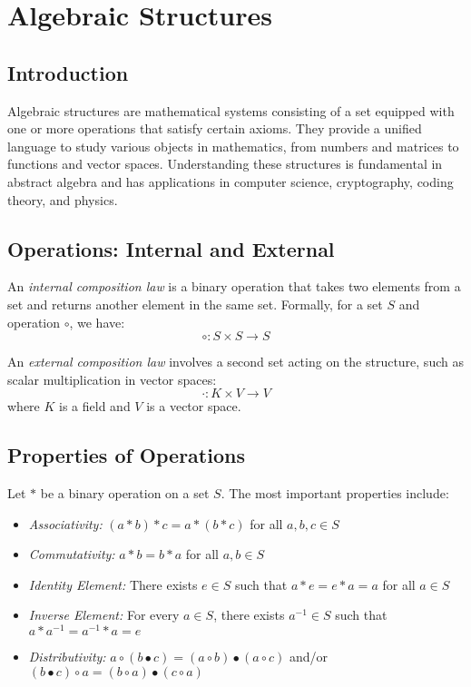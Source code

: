 \section{Algebraic Structures}

\subsection{Introduction}

Algebraic structures are mathematical systems consisting of a set equipped with one or more operations that satisfy certain axioms. They provide a unified language to study various objects in mathematics, from numbers and matrices to functions and vector spaces. Understanding these structures is fundamental in abstract algebra and has applications in computer science, cryptography, coding theory, and physics.

\subsection{Operations: Internal and External}

An \emph{internal composition law} is a binary operation that takes two elements from a set and returns another element in the same set. Formally, for a set \(S\) and operation \(\circ\), we have:
\[
\circ: S \times S \rightarrow S
\]

An \emph{external composition law} involves a second set acting on the structure, such as scalar multiplication in vector spaces:
\[
\cdot: K \times V \rightarrow V
\]
where \(K\) is a field and \(V\) is a vector space.

\subsection{Properties of Operations}

Let \(\ast\) be a binary operation on a set \(S\). The most important properties include:

\begin{itemize}[label=\(-\)]
    \item \emph{Associativity:} \((a \ast b) \ast c = a \ast (b \ast c)\) for all \(a,b,c \in S\)
    \item \emph{Commutativity:} \(a \ast b = b \ast a\) for all \(a,b \in S\)
    \item \emph{Identity Element:} There exists \(e \in S\) such that \(a \ast e = e \ast a = a\) for all \(a \in S\)
    \item \emph{Inverse Element:} For every \(a \in S\), there exists \(a^{-1} \in S\) such that \(a \ast a^{-1} = a^{-1} \ast a = e\)
    \item \emph{Distributivity:} \(a \circ (b \bullet c) = (a \circ b) \bullet (a \circ c)\) and/or \((b \bullet c) \circ a = (b \circ a) \bullet (c \circ a)\)
\end{itemize}

